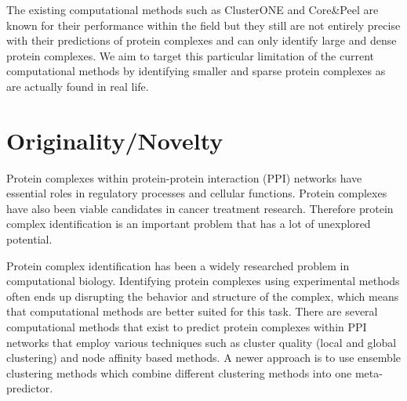 \documentclass[11pt]{article}
\begin{document}
The existing computational methods such as
ClusterONE and Core\&Peel are known for their
performance within the field but they still are
not entirely precise with their predictions of
protein complexes and can only identify large and
dense protein complexes. We aim to target this
particular limitation of the current
computational methods by identifying smaller and
sparse protein complexes as are actually found in
real life. 

\section{Originality/Novelty}
\label{lblNov}



% 
Protein complexes within protein-protein interaction (PPI) networks have essential roles 
in regulatory processes and cellular functions. Protein complexes have also been viable candidates 
in cancer treatment research. %
Therefore protein complex identification is an important problem that has a lot of unexplored
potential. 

Protein complex identification has been a widely researched problem in computational biology. 
Identifying protein complexes using experimental methods often ends up disrupting the behavior and 
structure of the complex, which means that computational methods are better suited for this task. 
There are several computational methods that exist to predict protein complexes within PPI networks
that employ various techniques such as cluster quality (local and global clustering) and node affinity 
based methods. A newer approach is to use ensemble clustering methods which combine 
different clustering methods into one meta-predictor. 
\end{document}
